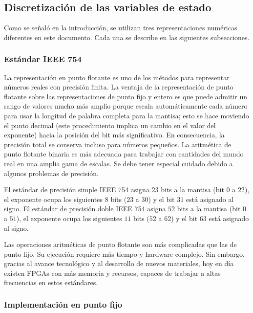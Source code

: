 \subsection{Discretización de las variables de estado}
\label{sec:numrepre}

Como se señaló en la introducción, se utilizan tres representaciones numéricas diferentes en este documento.
Cada una se describe en las siguientes subsecciones.

\subsubsection{Estándar IEEE 754}
\label{sec:impleFloat}

La representación en punto flotante es uno de los métodos para representar números reales con precisión finita.
La ventaja de la representación de punto flotante sobre las representaciones de punto fijo y entero es que puede admitir un rango de valores mucho más amplio porque escala automáticamente cada número para usar la longitud de palabra completa para la mantisa; esto se hace moviendo el punto decimal (este procedimiento implica un cambio en el valor del exponente) hacia la posición del bit más significativo.
En consecuencia, la precisión total se conserva incluso para números pequeños.
La aritmética de punto flotante binaria es más adecuada para trabajar con cantidades del mundo real en una amplia gama de escalas.
Se debe tener especial cuidado debido a algunos problemas de precisión.

El estándar de precisión simple IEEE 754 asigna $23$ bits a la mantisa (bit $0$ a $22$), el exponente ocupa los siguientes $8$ bits ($23$ a $30$) y el bit $31$ está asignado al signo.
El estándar de precisión doble IEEE 754 asigna $52$ bits a la mantisa (bit $0$ a $51$), el exponente ocupa los siguientes $11$ bits ($52$ a $62$) y el bit $63$ está asignado al signo.

Las operaciones aritméticas de punto flotante son más complicadas que las de punto fijo.
Su ejecución requiere más tiempo y hardware complejo.
Sin embargo, gracias al avance tecnológico y al desarrollo de nuevos materiales, hoy en día existen FPGAs con más memoria y recursos, capaces de trabajar a altas frecuencias en estos estándares.

\subsubsection{Implementación en punto fijo}
\label{sec:impleFix}

